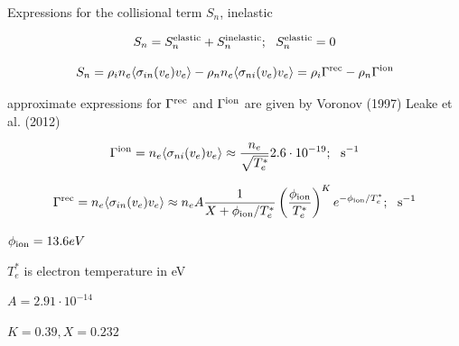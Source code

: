\documentclass{beamer}
\begin{document}
\begin{frame}{Expressions for the collisional term $S_n$, inelastic}

\begin{equation} \nonumber
S_n=S_n^{\rm elastic} + S_n^{\rm inelastic}; \,\,\,\, S_n^{\rm elastic}=0
\end{equation}


\begin{equation} \nonumber
S_n=\rho_i n_e \langle \sigma_{in} (v_e) v_e\rangle - \rho_n n_e \langle \sigma_{ni} (v_e) v_e\rangle =   \rho_i \Gamma^{\rm rec} - \rho_n\Gamma^{\rm ion}
\end{equation}

approximate expressions for $\Gamma^{\rm rec}$ and $\Gamma^{\rm ion}$ are given by Voronov (1997) Leake et al. (2012)

\begin{equation} \nonumber
\Gamma^{\rm ion} = n_e \langle  \sigma_{ni} (v_e)  v_e \rangle \approx \frac{n_e}{\sqrt{T_e^*}}	2.6 \cdot 10^{-19}; \,\,\,\, {\rm s^{-1}}
\end{equation}

\begin{equation} \nonumber
\Gamma^{\rm rec} =n_e \langle  \sigma_{in} (v_e)  v_e \rangle \approx n_e A \frac{1}{X + \phi_{\rm ion}/{T_e^*}}\left(\frac{\phi_{\rm ion}}{T_e^*}\right)^K  e^{-\phi_{\rm ion}/T_e^*}; \,\,\,\,  {\rm s^{-1}}
\end{equation}

$\phi_{\rm ion} = 13.6 eV$

$T_e^*$ is electron temperature in eV

$A = 2.91 \cdot 10^{-14}$

$K = 0.39, X = 0.232$

\end{frame}
\end{document}
